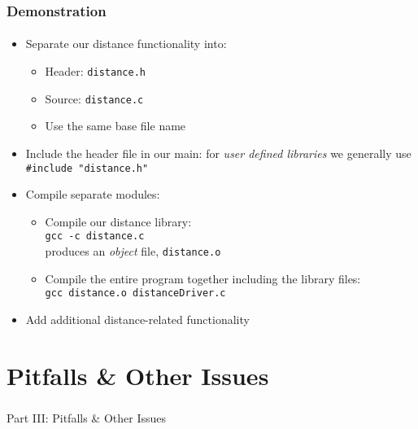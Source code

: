 \documentclass[]{beamer}
\begin{document}
\begin{frame}[fragile]
    \frametitle{Demonstration}
    \framesubtitle{}
    
\begin{itemize}[<+->]
  \item Separate our distance functionality into:
  \begin{itemize}
    \item Header: \texttt{distance.h}
    \item Source: \texttt{distance.c}
    \item Use the same base file name
  \end{itemize}
  \item Include the header file in our main: for \emph{user defined libraries} we generally use \texttt{#include "distance.h"}
  \item Compile separate modules:
  \begin{itemize}
    \item Compile our distance library:\\    
    \texttt{gcc -c distance.c}\\
    produces an \emph{object} file, \texttt{distance.o}
    \item Compile the entire program together including the library files:\\
    \texttt{gcc distance.o distanceDriver.c}\\
  \end{itemize}    
  \item Add additional distance-related functionality
\end{itemize}

\end{frame}


\section{Pitfalls \& Other Issues}

\begin{frame}
    \frametitle{}
    \framesubtitle{}
    
    \begin{center}
    {\Huge Part III: Pitfalls \& Other Issues}\\
    {\Large ~}
    \end{center}

\end{frame}
\end{document}
